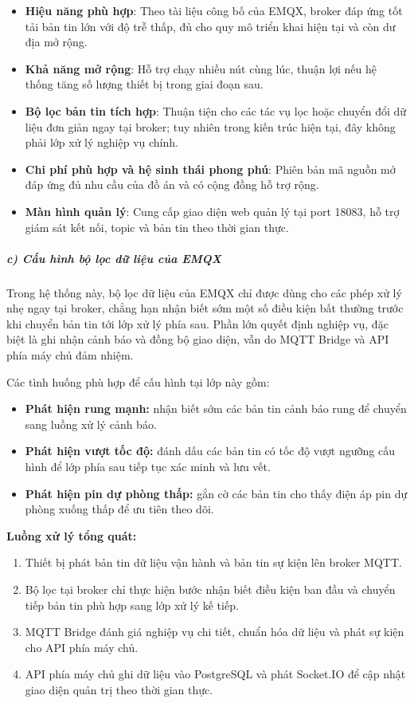 \documentclass[a4paper]{extarticle}
\providecommand{\tightlist}{%
  \setlength{\itemsep}{0pt}\setlength{\parskip}{0pt}}
\begin{document}
\begin{itemize}
\tightlist
\item
  \textbf{Hiệu năng phù hợp}: Theo tài liệu công bố của EMQX, broker đáp
  ứng tốt tải bản tin lớn với độ trễ thấp, đủ cho quy mô triển khai hiện
  tại và còn dư địa mở rộng.
\item
  \textbf{Khả năng mở rộng}: Hỗ trợ chạy nhiều nút cùng lúc, thuận lợi nếu
  hệ thống tăng số lượng thiết bị trong giai đoạn sau.
\item
  \textbf{Bộ lọc bản tin tích hợp}: Thuận tiện cho các tác vụ lọc hoặc
  chuyển đổi dữ liệu đơn giản ngay tại broker; tuy nhiên trong kiến trúc
  hiện tại, đây không phải lớp xử lý nghiệp vụ chính.
\item
  \textbf{Chi phí phù hợp và hệ sinh thái phong phú}: Phiên bản mã nguồn
  mở đáp ứng đủ nhu cầu của đồ án và có cộng đồng hỗ trợ rộng.
\item
  \textbf{Màn hình quản lý}: Cung cấp giao diện web quản lý tại port
  18083, hỗ trợ giám sát kết nối, topic và bản tin theo thời gian thực.
\end{itemize}

\subparagraph{c) Cấu hình bộ lọc dữ liệu của
EMQX}\label{c-cux1ea5u-huxecnh-emqx-rules-engine}

Trong hệ thống này, bộ lọc dữ liệu của EMQX chỉ được dùng cho các phép xử
lý nhẹ ngay tại broker, chẳng hạn nhận biết sớm một số điều kiện bất
thường trước khi chuyển bản tin tới lớp xử lý phía sau. Phần lớn quyết
định nghiệp vụ, đặc biệt là ghi nhận cảnh báo và đồng bộ giao diện, vẫn
do MQTT Bridge và API phía máy chủ đảm nhiệm.

Các tình huống phù hợp để cấu hình tại lớp này gồm:

\begin{itemize}
\tightlist
\item
  \textbf{Phát hiện rung mạnh:} nhận biết sớm các bản tin cảnh báo rung để
  chuyển sang luồng xử lý cảnh báo.
\item
  \textbf{Phát hiện vượt tốc độ:} đánh dấu các bản tin có tốc độ vượt
  ngưỡng cấu hình để lớp phía sau tiếp tục xác minh và lưu vết.
\item
  \textbf{Phát hiện pin dự phòng thấp:} gắn cờ các bản tin cho thấy điện
  áp pin dự phòng xuống thấp để ưu tiên theo dõi.
\end{itemize}

\textbf{Luồng xử lý tổng quát:}

\begin{enumerate}
\tightlist
\item
  Thiết bị phát bản tin dữ liệu vận hành và bản tin sự kiện lên broker
  MQTT.
\item
  Bộ lọc tại broker chỉ thực hiện bước nhận biết điều kiện ban đầu và
  chuyển tiếp bản tin phù hợp sang lớp xử lý kế tiếp.
\item
  MQTT Bridge đánh giá nghiệp vụ chi tiết, chuẩn hóa dữ liệu và phát sự
  kiện cho API phía máy chủ.
\item
  API phía máy chủ ghi dữ liệu vào PostgreSQL và phát Socket.IO để cập
  nhật giao diện quản trị theo thời gian thực.
\end{enumerate}
\end{document}
